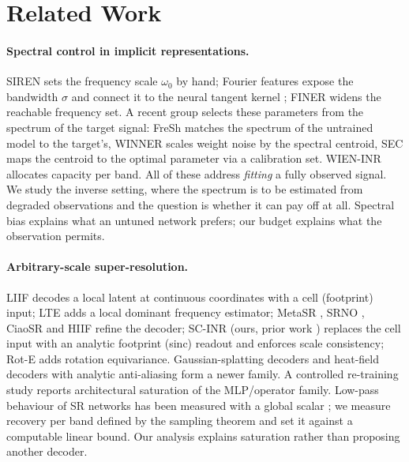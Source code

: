 \section{Related Work}\label{sec:related}

\paragraph{Spectral control in implicit representations.}
SIREN \citep{sitzmann2020siren} sets the frequency scale $\omega_0$ by hand;
Fourier features \citep{tancik2020fourier} expose the bandwidth $\sigma$ and
connect it to the neural tangent kernel \citep{jacot2018ntk}; FINER
\citep{liu2024finer} widens the reachable frequency set. A recent group
selects these parameters from the spectrum of the target signal: FreSh
\citep{kania2025fresh} matches the spectrum of the untrained model to the
target's, WINNER \citep{winner2025} scales weight noise by the spectral
centroid, SEC \citep{sec2026} maps the centroid to the optimal parameter via a
calibration set. WIEN-INR \citep{wieninr} allocates capacity per band. All of
these address \emph{fitting} a fully observed signal. We study the inverse
setting, where the spectrum is to be estimated from degraded observations and
the question is whether it can pay off at all. Spectral bias
\citep{rahaman2019spectral} explains what an untuned network prefers; our
budget explains what the observation permits.

\paragraph{Arbitrary-scale super-resolution.}
LIIF \citep{chen2021liif} decodes a local latent at continuous coordinates
with a cell (footprint) input; LTE \citep{lee2022lte} adds a local dominant
frequency estimator; MetaSR \citep{hu2019metasr}, SRNO \citep{wei2023srno},
CiaoSR \citep{cao2023ciaosr} and HIIF \citep{jiang2025hiif} refine the
decoder; SC-INR (ours, prior work ) replaces the cell input with an
analytic footprint (sinc) readout and enforces scale consistency; Rot-E
 adds rotation equivariance. Gaussian-splatting decoders
\citep{chen2025gsasr} and heat-field decoders with analytic anti-aliasing
\citep{becker2025thera} form a newer family. A controlled re-training study
\citep{nasir2026empirical} reports architectural saturation of the MLP/operator
family. Low-pass behaviour of SR networks has been measured with a global
scalar \citep{fsds2024}; we measure recovery per band defined by the sampling
theorem and set it against a computable linear bound. Our analysis explains
saturation rather than proposing another decoder.

